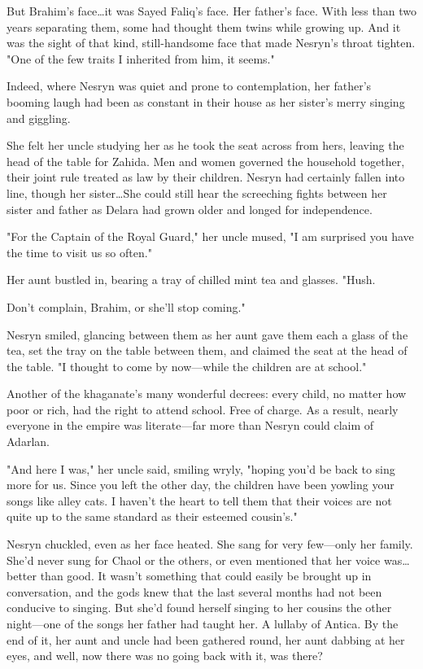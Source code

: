 But Brahim's face\ldots it was Sayed Faliq's face.
Her father's face.
With less than two years separating them, some had thought them twins while growing up.
And it was the sight of that kind, still-handsome face that made Nesryn's throat tighten.
"One of the few traits I inherited from him, it seems."

Indeed, where Nesryn was quiet and prone to contemplation, her father's booming laugh had been as constant in their house as her sister's merry singing and giggling.

She felt her uncle studying her as he took the seat across from hers, leaving the head of the table for Zahida.
Men and women governed the household together, their joint rule treated as law by their children.
Nesryn had certainly fallen into line, though her sister\ldots She could still hear the screeching fights between her sister and father as Delara had grown older and longed for independence.

"For the Captain of the Royal Guard," her uncle mused, "I am surprised you have the time to visit us so often."

Her aunt bustled in, bearing a tray of chilled mint tea and glasses.
"Hush.

Don't complain, Brahim, or she'll stop coming."

Nesryn smiled, glancing between them as her aunt gave them each a glass of the tea, set the tray on the table between them, and claimed the seat at the head of the table.
"I thought to come by now---while the children are at school."

Another of the khaganate's many wonderful decrees: every child, no matter how poor or rich, had the right to attend school.
Free of charge.
As a result, nearly everyone in the empire was literate---far more than Nesryn could claim of Adarlan.

"And here I was," her uncle said, smiling wryly, "hoping you'd be back to sing more for us.
Since you left the other day, the children have been yowling your songs like alley cats.
I haven't the heart to tell them that their voices are not quite up to the same standard as their esteemed cousin's."

Nesryn chuckled, even as her face heated.
She sang for very few---only her family.
She'd never sung for Chaol or the others, or even mentioned that her voice was\ldots better than good.
It wasn't something that could easily be brought up in conversation, and the gods knew that the last several months had not been conducive to singing.
But she'd found herself singing to her cousins the other night---one of the songs her father had taught her.
A lullaby of Antica.
By the end of it, her aunt and uncle had been gathered round, her aunt dabbing at her eyes, and  well, now there was no going back with it, was there?

